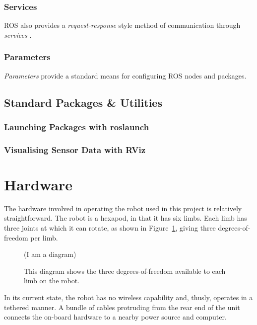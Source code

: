 \subsubsection{Services}
ROS also provides a \emph{request-response} style method of communication through \emph{services} \cite{ros_wiki_services}.

\subsubsection{Parameters}
\emph{Parameters} provide a standard means for configuring ROS nodes and packages.

\subsection{Standard Packages \& Utilities}
\subsubsection{Launching Packages with roslaunch}
\subsubsection{Visualising Sensor Data with RViz}


\section{Hardware}

The hardware involved in operating the robot used in this project is relatively straightforward. The robot is a hexapod, in that it has six limbs. Each limb has three joints at which it can rotate, as shown in Figure~\ref{fig:hexapod_dof}, giving three degrees-of-freedom per limb. 

\begin{figure}[!h]
    \centering
    (I am a diagram)
    \caption{This diagram shows the three degrees-of-freedom available to each limb on the robot.}
    \label{fig:hexapod_dof}
\end{figure}

In its current state, the robot has no wireless capability and, thusly, operates in a tethered manner. A bundle of cables protruding from the rear end of the unit connects the on-board hardware to a nearby power source and computer.

